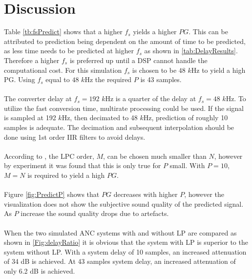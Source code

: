 \section{Discussion} \label{sec:discussion}
Table \ref{tb:fsPredict} shows that a higher $f_s$ yields a higher $PG$. This can be attributed to prediction being dependent on the amount of time to be predicted, as less time needs to be predicted at higher $f_s$ as shown in \autoref{tab:DelayResults}.  
Therefore a higher $f_s$ is preferred up until a DSP cannot handle the computational cost. For this simulation $f_s$ is chosen to be $48$ $k$Hz to yield a high PG. 
Using $f_s$ equal to $48$ $k$Hz the required $P$ is 43 samples.  
\\\\
The converter delay at $f_s=192$ $k$Hz is a quarter of the delay at $f_s=48$ $k$Hz. To utilize the fast conversion time, multirate processing could be used. If the signal is sampled at 192 $k$Hz, then decimated to 48 $k$Hz, prediction of roughly 10 samples is adequate. The decimation and subsequent interpolation should be done using 1st order IIR filters to avoid delays.  
\\\\
According to \cite{Speech}, the LPC order, $M$, can be chosen much smaller than $N$, however by experiment it was found that this is only true for $P$ small. With $P=10$, $M=N$ is required to yield a high $PG$. 
\\\\
Figure \ref{fig:PredictP} shows that $PG$ decreases with higher $P$, however the visualization does not show the subjective sound quality of the predicted signal. As $P$ increase the sound quality drops due to artefacts.    
\\\\
When the two simulated ANC systems with and without LP are compared as shown in \autoref{Fig:delayRatio} it is obvious that the system with LP is superior to the system without LP. With a system delay of 10 samples, an increased attenuation of 34 dB is achieved. At 43 samples system delay, an increased attenuation of only 6.2 dB is achieved. %
